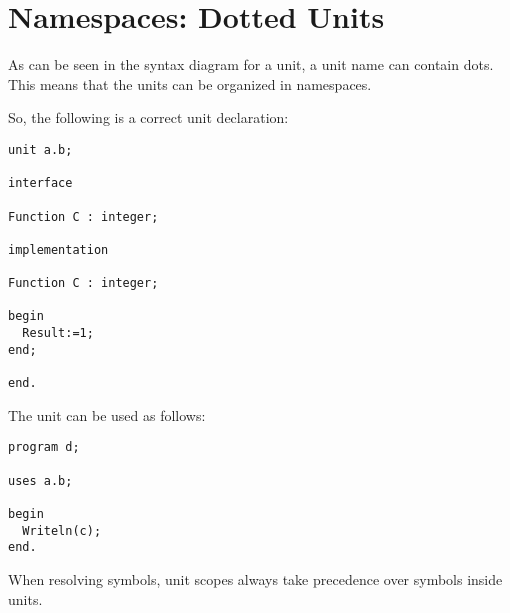 \section{Namespaces: Dotted Units}
As can be seen in the syntax diagram for a unit, a unit name can contain dots.
This means that the units can be organized in namespaces.

So, the following is a correct unit declaration:
\begin{verbatim}
unit a.b;

interface 

Function C : integer;

implementation

Function C : integer;

begin
  Result:=1;
end;

end.
\end{verbatim}
The unit can be used as follows:
\begin{verbatim}
program d;

uses a.b;

begin
  Writeln(c);
end.
\end{verbatim}
When resolving symbols, unit scopes always take precedence over symbols inside units.

